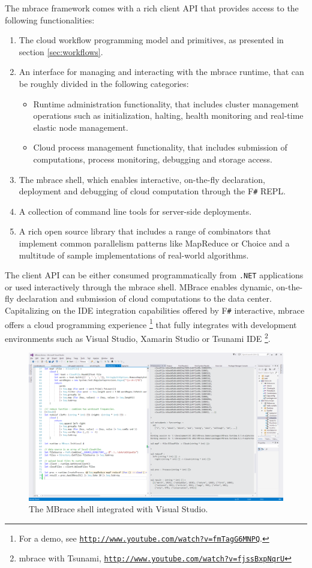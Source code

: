 \documentclass[9pt,a4paper]{article}
\newcommand{\mbrace}{mbrace}
\newcommand{\Mbrace}{MBrace}
\newcommand{\fsharp}{F\texttt \#}
\newcommand{\dotnet}{\texttt{\hbox{.}NET}}
\newcommand{\samehref}[1]{\href{#1}{\texttt{#1}}}
\begin{document}
The \mbrace{} framework comes with a rich client API that provides access to the 
following functionalities:
\begin{enumerate}
\item The cloud workflow programming model and primitives, as presented in section
\ref{sec:workflows}.
\item An interface for managing and interacting with the \mbrace{} runtime, 
that can be roughly divided in the following categories:
	\begin{itemize}
		\item Runtime administration functionality, that includes cluster management
		operations such as initialization, halting, health monitoring and
		real-time elastic node management.
		\item Cloud process management functionality, that includes submission of
		computations, process monitoring, debugging and storage access.
	\end{itemize}

\item The \mbrace{} shell, which enables interactive, on-the-fly declaration,
deployment and debugging of cloud computation through the \fsharp{} REPL.
\item A collection of command line tools for server-side deployments.
\item A rich open source library that includes a range of combinators that
implement common parallelism patterns like MapReduce or Choice and a multitude of 
sample implementations of real-world algorithms.
\end{enumerate}
%
The client API can be either consumed programmatically from \dotnet{} applications
or used interactively through the \mbrace{} shell.
\Mbrace{} enables dynamic, on-the-fly declaration and submission of cloud 
computations to the data center. Capitalizing on the IDE integration capabilities 
offered by \fsharp{} interactive, \mbrace{} offers a cloud programming experience%
\footnote{For a demo, see \samehref{http://www.youtube.com/watch?v=fmTagG6MNPQ}.}
that fully integrates with development environments such as Visual Studio,
Xamarin Studio or Tsunami IDE%
\footnote{\mbrace{} with Tsunami, \samehref{http://www.youtube.com/watch?v=fjssBxpNqrU}}.

\begin{figure}[ht]
\label{shellfig}
\centering
\includegraphics[width=\textwidth]{shell2.png}
\caption{The \Mbrace{} shell integrated with Visual Studio.}
\end{figure}
\end{document}
